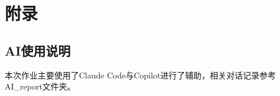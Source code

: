 \documentclass[UTF8,a4paper,10pt]{ctexart}
\begin{document}
\section*{附录}
\subsection*{AI使用说明}
本次作业主要使用了Claude Code与Copilot进行了辅助，相关对话记录参考AI\_report文件夹。

% 
% 
\end{document}

